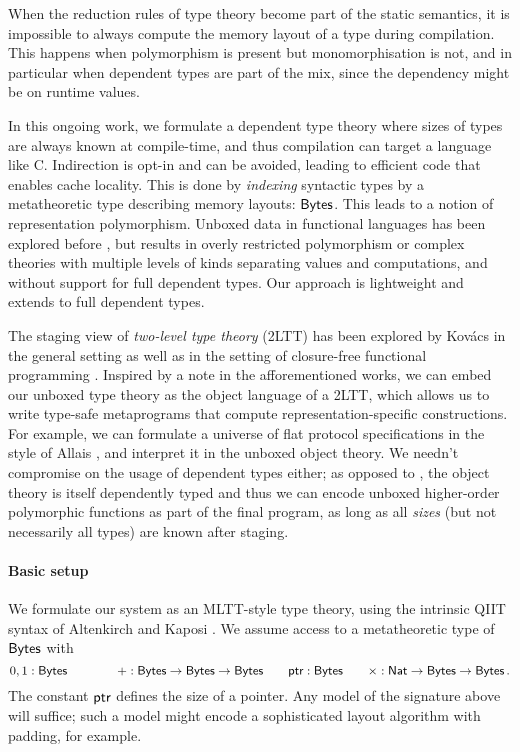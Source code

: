 When the reduction rules of type theory become part of the static semantics, it
is impossible to always compute the memory layout of a type during compilation.
This happens when polymorphism is present but monomorphisation is not, and in
particular when dependent types are part of the mix, since the dependency might
be on runtime values.

In this ongoing work, we formulate a dependent type theory where sizes of types
are always known at compile-time, and thus compilation can target a language
like C. Indirection is opt-in and can be avoided, leading to efficient code that
enables cache locality. This is done by \emph{indexing} syntactic types by a
metatheoretic type describing memory layouts: $\textsf{Bytes}$. This leads to a notion
of representation polymorphism. Unboxed data in functional languages has been
explored before \cite{Jones1991-ik,Downen2024-nk}, but results in overly restricted
polymorphism or complex theories with multiple levels of kinds separating values and computations, and without
support for full dependent types. Our approach is lightweight and extends to
full dependent types.

The staging view of \emph{two-level type theory} (2LTT) \cite{Annenkov2023-vk}
has been explored by Kov\'acs in the general setting \cite{Kovacs2022-rf} as
well as in the setting of closure-free functional programming
\cite{Kovacs2024-hn}. Inspired by a note in the afforementioned works, we can embed
our unboxed type theory as the object language of a 2LTT, which allows us to
write type-safe metaprograms that compute representation-specific constructions.
For example, we can formulate a universe of flat protocol specifications in the
style of Allais \cite{Allais2023-zq}, and interpret it in the unboxed object
theory.
We needn't compromise on the usage of dependent types either; as opposed to
\cite{Kovacs2024-hn}, the object theory is itself dependently typed and thus we
can encode unboxed higher-order polymorphic functions as part of the final
program, as long as all \emph{sizes} (but not necessarily all types) are known after staging.

\paragraph{Basic setup}
We formulate our system as an MLTT-style type theory, using the intrinsic QIIT
syntax of Altenkirch and Kaposi \cite{Altenkirch2016-zc}.
We assume access to a metatheoretic type of
\(\textsf{Bytes}\) with
\[
0, 1 : \textsf{Bytes} \qquad \qquad + : \textsf{Bytes} \to \textsf{Bytes} \to \textsf{Bytes} \qquad \textsf{ptr} : \textsf{Bytes} \qquad \times : \textsf{Nat} \to \textsf{Bytes} \to \textsf{Bytes} \,.
\]
The constant \(\textsf{ptr}\) defines the size of a pointer. Any model of
the signature above will suffice; such a model might encode a sophisticated
layout algorithm with padding, for example.


